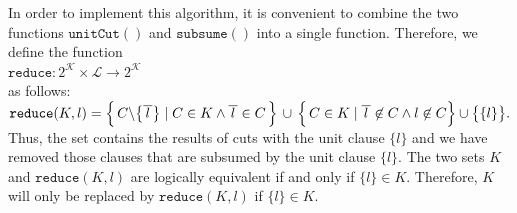 In order to implement this algorithm, it is convenient to combine the two functions $\texttt{unitCut}()$ and
$\texttt{subsume}()$ into a single function. Therefore, we define the function
\\[0.2cm]
\hspace*{1.3cm}
$\texttt{reduce}: 2^\mathcal{K} \times \mathcal{L} \rightarrow 2^\mathcal{K}$
\\[0.2cm]
as follows: 
\\[0.2cm]
\hspace*{1.3cm}
$\texttt{reduce}(K,l)  = 
 \Bigl\{\, C \backslash \bigl\{\overline{\,l\,}\bigr\} \;|\; C \in K \wedge \overline{\,l\,} \in C \,\Bigr\} 
       \,\cup\, \Bigl\{\, C \in K \mid \overline{\,l\,} \not\in C \wedge l \not\in C \Bigr\} \cup \bigl\{\{l\}\bigr\}.
$
\\[0.2cm]
Thus, the set contains the results of cuts with
the unit clause $\{l\}$ and we have removed those clauses that are subsumed by the unit clause $\{l\}$.
The two sets $K$ and $\texttt{reduce}(K,l)$ are logically equivalent if and only if $\{l\} \in K$.
Therefore, $K$ will only be replaced by $\mathtt{reduce}(K, l)$ if $\{l\} \in K$.

